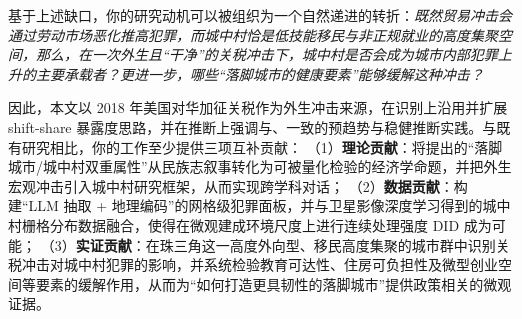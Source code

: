 基于上述缺口，你的研究动机可以被组织为一个自然递进的转折：\emph{既然贸易冲击会通过劳动市场恶化推高犯罪，而城中村恰是低技能移民与非正规就业的高度集聚空间，那么，在一次外生且“干净”的关税冲击下，城中村是否会成为城市内部犯罪上升的主要承载者？更进一步，哪些“落脚城市的健康要素”能够缓解这种冲击？}

因此，本文以 2018 年美国对华加征关税作为外生冲击来源，在识别上沿用并扩展 shift-share 暴露度思路，并在推断上强调与\citet{goldsmithpinkham2020bartik}、\citet{adao2019shiftshare}一致的预趋势与稳健推断实践。与既有研究相比，你的工作至少提供三项互补贡献：%
（1）\textbf{理论贡献}：将\citeauthor{saunders2010arrival}提出的“落脚城市/城中村双重属性”从民族志叙事转化为可被量化检验的经济学命题，并把外生宏观冲击引入城中村研究框架，从而实现跨学科对话；%
（2）\textbf{数据贡献}：构建“LLM 抽取 + 地理编码”的网格级犯罪面板，并与卫星影像深度学习得到的城中村栅格分布数据融合，使得在微观建成环境尺度上进行连续处理强度 DID 成为可能；%
（3）\textbf{实证贡献}：在珠三角这一高度外向型、移民高度集聚的城市群中识别关税冲击对城中村犯罪的影响，并系统检验教育可达性、住房可负担性及微型创业空间等要素的缓解作用，从而为“如何打造更具韧性的落脚城市”提供政策相关的微观证据。

